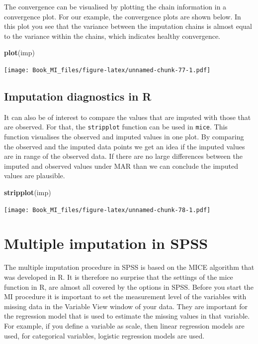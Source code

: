 \documentclass[]{book}
\newenvironment{Shaded}{\begin{snugshade}}{\end{snugshade}}
\newcommand{\KeywordTok}[1]{\textcolor[rgb]{0.13,0.29,0.53}{\textbf{#1}}}
\newcommand{\NormalTok}[1]{#1}
\begin{document}
The convergence can be visualised by plotting the chain information in a
convergence plot. For our example, the convergence plots are shown
below. In this plot you see that the variance between the imputation
chains is almost equal to the variance within the chains, which
indicates healthy convergence.

\begin{Shaded}
\begin{Highlighting}[]
\KeywordTok{plot}\NormalTok{(imp)}
\end{Highlighting}
\end{Shaded}

\texttt{[image: Book\_MI\_files/figure-latex/unnamed-chunk-77-1.pdf]}

\subsection{Imputation diagnostics in
R}\label{imputation-diagnostics-in-r}

It can also be of interest to compare the values that are imputed with
those that are observed. For that, the \texttt{stripplot} function can
be used in \texttt{mice}. This function visualises the observed and
imputed values in one plot. By comparing the observed and the imputed
data points we get an idea if the imputed values are in range of the
observed data. If there are no large differences between the imputed and
observed values under MAR than we can conclude the imputed values are
plausible.

\begin{Shaded}
\begin{Highlighting}[]
\KeywordTok{stripplot}\NormalTok{(imp)}
\end{Highlighting}
\end{Shaded}

\texttt{[image: Book\_MI\_files/figure-latex/unnamed-chunk-78-1.pdf]}

\section{Multiple imputation in SPSS}\label{multiple-imputation-in-spss}

The multiple imputation procedure in SPSS is based on the MICE algorithm
that was developed in R. It is therefore no surprise that the settings
of the mice function in R, are almost all covered by the options in
SPSS. Before you start the MI procedure it is important to set the
measurement level of the variables with missing data in the Variable
View window of your data. They are important for the regression model
that is used to estimate the missing values in that variable. For
example, if you define a variable as scale, then linear regression
models are used, for categorical variables, logistic regression models
are used.
\end{document}
